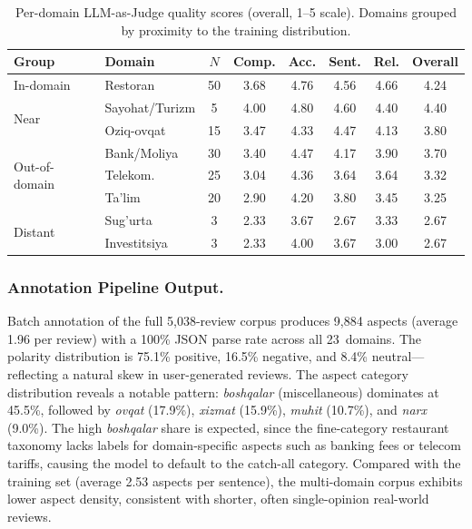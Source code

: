 \documentclass[runningheads]{llncs}
\begin{document}
\begin{table}[t]
\centering
\caption{Per-domain LLM-as-Judge quality scores (overall, 1--5 scale). Domains grouped by proximity to the training distribution.}
\label{tab:domain_quality}
\setlength{\tabcolsep}{4pt}
\begin{tabular}{llcccccc}
\toprule
\textbf{Group} & \textbf{Domain} & $N$ & \textbf{Comp.} & \textbf{Acc.} & \textbf{Sent.} & \textbf{Rel.} & \textbf{Overall} \\
\midrule
In-domain    & Restoran       & 50 & 3.68 & 4.76 & 4.56 & 4.66 & 4.24 \\
\midrule
\multirow{2}{*}{Near}
             & Sayohat/Turizm & 5  & 4.00 & 4.80 & 4.60 & 4.40 & 4.40 \\
             & Oziq-ovqat     & 15 & 3.47 & 4.33 & 4.47 & 4.13 & 3.80 \\
\midrule
\multirow{3}{*}{Out-of-domain}
             & Bank/Moliya    & 30 & 3.40 & 4.47 & 4.17 & 3.90 & 3.70 \\
             & Telekom.       & 25 & 3.04 & 4.36 & 3.64 & 3.64 & 3.32 \\
             & Ta'lim         & 20 & 2.90 & 4.20 & 3.80 & 3.45 & 3.25 \\
\midrule
\multirow{2}{*}{Distant}
             & Sug'urta       & 3  & 2.33 & 3.67 & 2.67 & 3.33 & 2.67 \\
             & Investitsiya   & 3  & 2.33 & 4.00 & 3.67 & 3.00 & 2.67 \\
\bottomrule
\end{tabular}
\end{table}

\subsubsection{Annotation Pipeline Output.}
\label{sec:res_annotation_output}

Batch annotation of the full 5{,}038-review corpus produces 9{,}884 aspects (average 1.96 per review) with a 100\% JSON parse rate across all 23~domains. The polarity distribution is 75.1\% positive, 16.5\% negative, and 8.4\% neutral---reflecting a natural skew in user-generated reviews. The aspect category distribution reveals a notable pattern: \emph{boshqalar} (miscellaneous) dominates at 45.5\%, followed by \emph{ovqat} (17.9\%), \emph{xizmat} (15.9\%), \emph{muhit} (10.7\%), and \emph{narx} (9.0\%). The high \emph{boshqalar} share is expected, since the fine-category restaurant taxonomy lacks labels for domain-specific aspects such as banking fees or telecom tariffs, causing the model to default to the catch-all category. Compared with the training set (average 2.53 aspects per sentence), the multi-domain corpus exhibits lower aspect density, consistent with shorter, often single-opinion real-world reviews.
\end{document}
